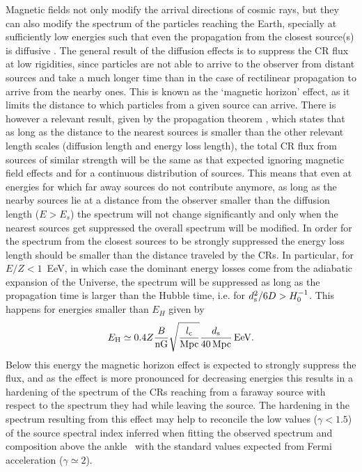 \documentclass[twoside,12pt]{article}
\begin{document}
Magnetic fields not only modify the arrival directions of cosmic rays, but they  can also modify the spectrum of the particles reaching the Earth, specially at sufficiently low  energies such that even the propagation from the closest source(s) is diffusive \cite{le04,be06,gl07,mo13}. The general result of the diffusion effects is to suppress the CR flux at low rigidities, since particles are not able to arrive to the observer from distant sources and take a much longer time than in the case of rectilinear propagation to arrive from the nearby ones. This is known as the `magnetic horizon' effect, as it limits the distance to which particles from a given source can arrive. There is however a relevant result, given by the propagation theorem \cite{propagationth}, which states that as long as the distance to the nearest sources is smaller than the other relevant length scales (diffusion length and energy loss length), the total CR flux from sources of similar strength will be the same as that expected ignoring magnetic field effects and for a continuous distribution of sources. This means that even at energies for which far away sources do not contribute anymore, as long as the nearby sources lie at a distance from the observer smaller than the diffusion length ($E>E_s$) the spectrum will not change  significantly  and only when the nearest sources get suppressed the overall spectrum will be modified.  In order for the spectrum from the closest sources to be strongly suppressed the energy loss length should be smaller than the distance traveled by the CRs. In particular, for $E/Z<1$~EeV, in which case the dominant energy losses come from the adiabatic expansion of the Universe, the spectrum will be suppressed as long as the propagation time is larger than the Hubble time, i.e. for $d_{\rm s}^2/6D>H_0^{-1}$. This happens for energies smaller than $E_H$ given by
\begin{equation}
E_{\rm H} \simeq 0.4 Z  \frac{B}{\rm nG}\sqrt{\frac{l_{\rm c} }{\rm Mpc}}\frac{d_{\rm s}}{40\, {\rm Mpc}}\,{\rm EeV}.
\end{equation}
Below this energy the magnetic horizon effect is expected to strongly suppress the flux, and as the effect is more pronounced for decreasing energies this results in a hardening of the spectrum of the CRs reaching  from a faraway  source with respect to the spectrum they had while leaving the source.
The hardening in the spectrum resulting from this effect \cite{mo13} may help to reconcile the low values ($\gamma <1.5$) of the source spectral index inferred when fitting the observed spectrum and composition above the ankle~\cite{combfit} with the standard values expected  from Fermi acceleration ($\gamma \simeq  2$).
\end{document}
